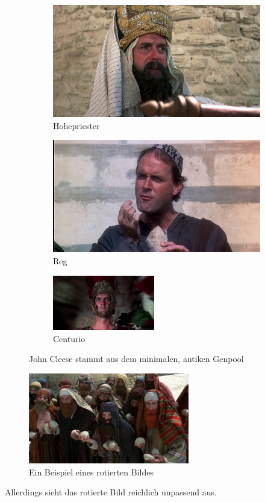 \documentclass{scrartcl}
\begin{document}
	\begin{figure}[b]
		\begin{subfigure}{.3\textwidth}
				\includegraphics[width=\textwidth]{brian1}
			    \caption{Hohepriester}
		\end{subfigure}
	    \begin{subfigure}{.3\textwidth}
	    	\includegraphics[width=\textwidth]{brian2}
	    	\caption{Reg}
	    \end{subfigure}
        \begin{subfigure}{.333\textwidth}
        	\includegraphics[width=\textwidth, height=24mm]{brian3}
        	\caption{Centurio}
        \end{subfigure}
    \caption{John Cleese stammt aus dem minimalen, antiken Genpool}		
	\end{figure}


\blindtext


\begin{figure}[h]
	\centering
	\includegraphics[angle=5, width=7cm]{brian4}
	\caption{Ein Beispiel eines rotierten Bildes}
\end{figure} 

Allerdings sieht das rotierte Bild reichlich unpassend aus.
\end{document}
